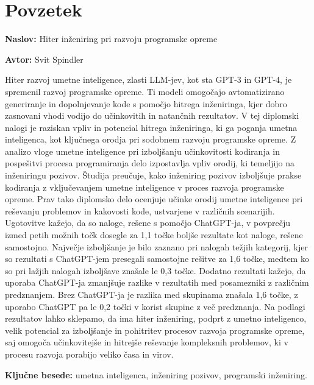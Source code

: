 \documentclass[a4paper,12pt,openright]{book}
\newcommand{\ttitle}{Hiter inženiring pri razvoju programske opreme}
\newcommand{\tauthor}{Svit Spindler}
\newcommand{\tkeywords}{umetna inteligenca, inženiring pozivov, programski inženiring}
\newcommand{\clearemptydoublepage}{\newpage{\pagestyle{empty}\cleardoublepage}}
\begin{document}
\clearemptydoublepage

{}
\chapter*{Povzetek}

\noindent\textbf{Naslov:} \ttitle
\bigskip

\noindent\textbf{Avtor:} \tauthor
\bigskip

Hiter razvoj umetne inteligence, zlasti LLM-jev, kot sta GPT-3 in GPT-4, je spremenil razvoj programske opreme. Ti modeli omogočajo avtomatizirano generiranje in dopolnjevanje kode s pomočjo hitrega inženiringa, kjer dobro zasnovani vhodi vodijo do učinkovitih in natančnih rezultatov. V tej diplomski nalogi je raziskan vpliv in potencial hitrega inženiringa, ki ga poganja umetna inteligenca, kot ključnega orodja pri sodobnem razvoju programske opreme. Z analizo vloge umetne inteligence pri izboljšanju učinkovitosti kodiranja in pospešitvi procesa programiranja delo izpostavlja vpliv orodij, ki temeljijo na inženiringu pozivov. Študija preučuje, kako inženiring pozivov izboljšuje prakse kodiranja z vključevanjem umetne inteligence v proces razvoja programske opreme. Prav tako diplomsko delo ocenjuje učinke orodij umetne inteligence pri reševanju problemov in kakovosti kode, ustvarjene v različnih scenarijih. 
Ugotovitve kažejo, da so naloge, rešene s pomočjo ChatGPT-ja, v povprečju izmed petih možnih točk dosegle za 1,1 točke boljše rezultate kot naloge, rešene samostojno. 
Največje izboljšanje je bilo zaznano pri nalogah težjih kategorij, kjer so rezultati s ChatGPT-jem presegali samostojne rešitve za 1,6 točke, medtem ko so pri lažjih nalogah izboljšave znašale le 0,3 točke.
Dodatno rezultati kažejo, da uporaba ChatGPT-ja zmanjšuje razlike v rezultatih med posamezniki z različnim predznanjem. Brez ChatGPT-ja je razlika med skupinama znašala 1,6 točke, z uporabo ChatGPT pa le 0,2 točki v korist skupine z več predznanja. Na podlagi rezultatov lahko sklepamo, da ima hiter inženiring, podprt z umetno inteligenco, velik potencial za izboljšanje in pohitritev procesov razvoja programske opreme, saj omogoča učinkovitejše in hitrejše reševanje kompleksnih problemov, ki v procesu razvoja porabijo veliko časa in virov.

\bigskip

\noindent\textbf{Ključne besede:} \tkeywords.
\clearemptydoublepage
\end{document}
